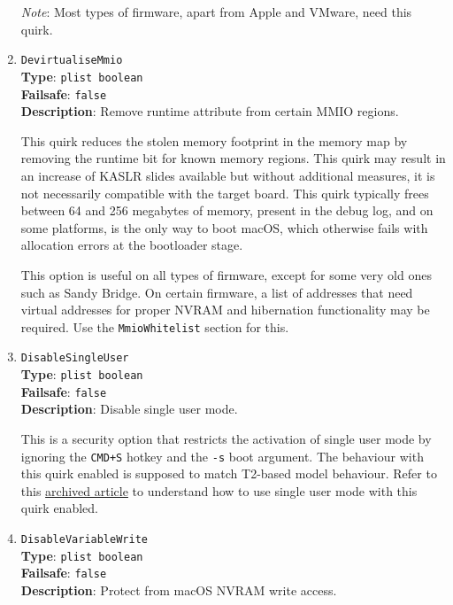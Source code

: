 \documentclass[]{article}
\begin{document}
\begin{enumerate}
  \emph{Note}: Most types of firmware, apart from Apple and VMware, need this quirk.

\item
  \texttt{DevirtualiseMmio}\\
  \textbf{Type}: \texttt{plist\ boolean}\\
  \textbf{Failsafe}: \texttt{false}\\
  \textbf{Description}: Remove runtime attribute from certain MMIO regions.

  This quirk reduces the stolen memory footprint in the memory map by removing
  the runtime bit for known memory regions. This quirk may result in an increase
  of KASLR slides available but without additional measures, it is not necessarily
  compatible with the target board. This quirk typically frees between 64 and 256
  megabytes of memory, present in the debug log, and on some platforms, is the only way
  to boot macOS, which otherwise fails with allocation errors at the bootloader stage.

  This option is useful on all types of firmware, except for some very old
  ones such as Sandy Bridge. On certain firmware, a list of addresses that need
  virtual addresses for proper NVRAM and hibernation functionality may be required.
  Use the \texttt{MmioWhitelist} section for this.

\item
  \texttt{DisableSingleUser}\\
  \textbf{Type}: \texttt{plist\ boolean}\\
  \textbf{Failsafe}: \texttt{false}\\
  \textbf{Description}: Disable single user mode.

  This is a security option that restricts the activation of single user mode
  by ignoring the \texttt{CMD+S} hotkey and the \texttt{-s} boot argument. The
  behaviour with this quirk enabled is supposed to match T2-based model behaviour.
  Refer to this
  \href{https://web.archive.org/web/20200517125051/https://support.apple.com/en-us/HT201573}{archived article}
  to understand how to use single user mode with this quirk enabled.

\item
  \texttt{DisableVariableWrite}\\
  \textbf{Type}: \texttt{plist\ boolean}\\
  \textbf{Failsafe}: \texttt{false}\\
  \textbf{Description}: Protect from macOS NVRAM write access.


\end{enumerate}
\end{document}
